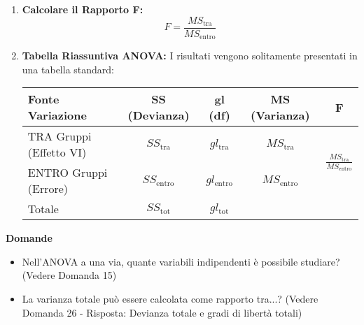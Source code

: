 \documentclass[12pt, a4paper]{article}
\newenvironment{reflectionbox}{%
    \medskip
    \begin{framed}\par\noindent
    \textbf{\color{boxtitlecolor}Domande} \par
    \begin{itemize}[leftmargin=*, label=$\blacktriangleright$]
}{%
    \end{itemize}\par
    \end{framed}
    \medskip
}
\newcommand{\Fscore}{F} %
\newcommand{\df}{gl} %
\newcommand{\SSb}{SS_{\text{tra}}} %
\newcommand{\SSw}{SS_{\text{entro}}} %
\newcommand{\SStot}{SS_{\text{tot}}} %
\newcommand{\MSb}{MS_{\text{tra}}} %
\newcommand{\MSw}{MS_{\text{entro}}} %
\newcommand{\dfb}{\df_{\text{tra}}} %
\newcommand{\dfw}{\df_{\text{entro}}} %
\newcommand{\dftot}{\df_{\text{tot}}} %
\begin{document}
\begin{enumerate}
\begin{itemize}
        \end{itemize}
    \item \textbf{Calcolare il Rapporto F:}
        $$ \Fscore = \frac{\MSb}{\MSw} $$
    \item \textbf{Tabella Riassuntiva ANOVA:} I risultati vengono solitamente presentati in una tabella standard:
        \begin{center}
        \begin{tabular}{lcccc} %
            \toprule
            Fonte Variazione & SS (Devianza) & gl (df) & MS (Varianza) & F  \\
            \midrule
            TRA Gruppi (Effetto VI) & $\SSb$ & $\dfb$ & $\MSb$ & \multirow{2}{*}{$\frac{\MSb}{\MSw}$}  \\
            ENTRO Gruppi (Errore) & $\SSw$ & $\dfw$ & $\MSw$ &    \\
            \midrule
            Totale & $\SStot$ & $\dftot$ & &  \\
            \bottomrule
        \end{tabular}
        \end{center}
\end{enumerate}

\begin{reflectionbox}
    \item Nell'ANOVA a una via, quante variabili indipendenti è possibile studiare? (Vedere Domanda 15)
    \item La varianza totale può essere calcolata come rapporto tra...? (Vedere Domanda 26 - Risposta: Devianza totale e gradi di libertà totali)
\end{reflectionbox}
\end{document}
